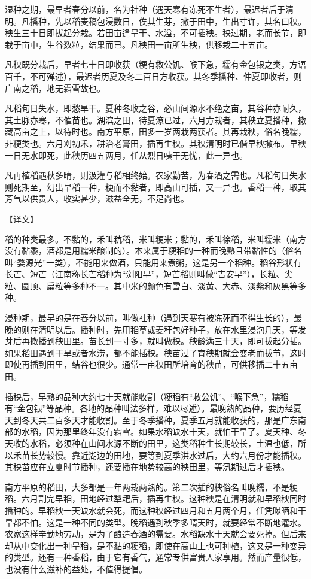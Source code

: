 \documentclass[12pt,UTF8]{ctexbook}
\begin{document}
湿种之期，最早者春分以前，名为社种（遇天寒有冻死不生者），最迟者后于清明。凡播种，先以稻麦稿包浸数日，俟其生芽，撒于田中，生出寸许，其名曰秧。秧生三十日即拔起分栽。若田亩逢旱干、水溢，不可插秧。秧过期，老而长节，即栽于亩中，生谷数粒，结果而已。凡秧田一亩所生秧，供移栽二十五亩。

凡秧既分栽后，早者七十日即收获（粳有救公饥、喉下急，糯有金包银之类，方语百千，不可殚述），最迟者历夏及冬二百日方收获。其冬季播种、仲夏即收者，则广南之稻，地无霜雪故也。

凡稻旬日失水，即愁旱干。夏种冬收之谷，必山间源水不绝之亩，其谷种亦耐久，其土脉亦寒，不催苗也。湖滨之田，待夏潦已过，六月方栽者，其秧立夏播种，撒藏高亩之上，以待时也。南方平原，田多一岁两栽两获者。其再栽秧，俗名晚糯，非粳类也。六月刈初禾，耕治老膏田，插再生秧。其秧清明时已偕早秧撒布。早秧一日无水即死，此秧历四五两月，任从烈日咦干无忧，此一异也。

凡再植稻遇秋多晴，则汲灌与稻相终始。农家勤苦，为春酒之需也。凡稻旬日失水则死期至，幻出早稻一种，粳而不黏者，即高山可插，又一异也。香稻一种，取其芳气以供贵人，收实甚少，滋益全无，不足尚也。

【译文】

稻的种类最多。不黏的，禾叫秔稻，米叫粳米；黏的，禾叫徐稻，米叫糯米（南方没有黏黍，酒都是用糯米酿制的）。本来属于粳稻的一种而晚熟且带黏性的（俗名叫“婺源光”一类），不能用来做酒，只能用来煮粥，这是另一个稻种。稻谷形状有长芒、短芒（江南称长芒稻种为“浏阳早”，短芒稻则叫做“吉安早”），长粒、尖粒、圆顶、扁粒等多种不一。其中米的颜色有雪白、淡黄、大赤、淡紫和灰黑等多种。

浸种期，最早的是在春分以前，叫做社种（遇到天寒有被冻死而不得生长的），最晚的则在清明以后。播种时，先用稻草或麦秆包好种子，放在水里浸泡几天，等发芽后再撒播到秧田里。苗长到一寸多，就叫做秧。秧龄满三十天，即可拔起分插。如果稻田遇到干旱或者水涝，都不能插秧。秧苗过了育秧期就会变老而拔节，这时即使再插到田里，结谷也很少。通常一亩秧田所培育的秧苗，可供移插二十五亩田。

插秧后，早熟的品种大约七十天就能收割（粳稻有“救公饥”、“喉下急”，糯稻有“金包银”等品种。各地的品种叫法多样，难以尽述）。最晚熟的品种，要历经夏天到冬天共二百多天才能收割。至于冬季播种，夏季五月就能收获的，那是广东南部的水稻，因为那里终年没有霜雪。如果水稻缺水十天，就怕干旱了。夏天种、冬天收的水稻，必须种在山间水源不断的田里，这类稻种生长期较长，土温也低，所以禾苗长势较慢。靠近湖边的田地，要等到夏季洪水过后，大约六月份才能插秧。其秧苗应在立夏时节播种，还要播在地势较高的秧田里，等汛期过后才插秧。

南方平原的稻田，大多都是一年两栽两熟的。第二次插的秧俗名叫晚糯，不是粳稻。六月割完早稻，田地经过犁耙后，插再生秧。这种秧是在清明就和早稻秧同时播种的。早稻秧一天缺水就会死，而这种秧经过四月和五月两个月，任凭曝晒和干旱都不怕。这是一种不同的类型。晚稻遇到秋季多晴天时，就要经常不断地灌水。农家这样辛勤地劳动，是为了酿造春酒的需要。水稻缺水十天就会要死掉。但后来却从中变化出一种旱稻，是不黏的粳稻，即使在高山上也可种植，这又是一种变异的类型。还有一种香稻，由于它有香气，通常专供富贵人家享用。然而产量很低，也没有什么滋补的益处，不值得提倡。
\end{document}
